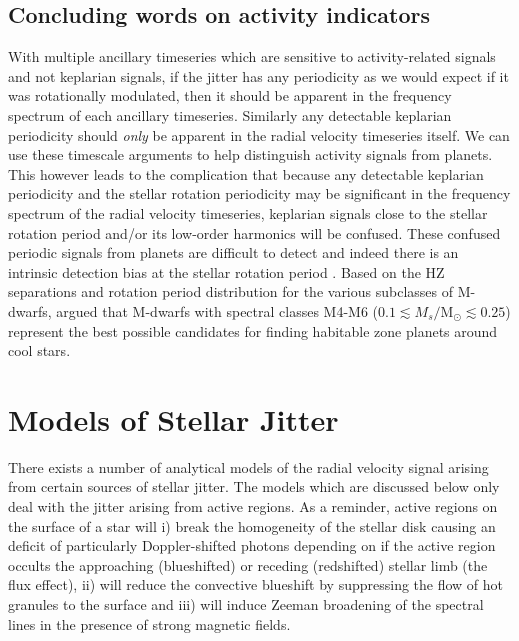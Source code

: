 \subsection{Concluding words on activity indicators}
With multiple ancillary timeseries which are sensitive to activity-related signals and not 
keplarian signals, if the jitter has any periodicity as we would expect if it was rotationally 
modulated, then it should be apparent in the frequency spectrum of each ancillary timeseries. 
Similarly any detectable keplarian periodicity should \emph{only} be apparent in the radial 
velocity timeseries itself. We can use these timescale arguments to help distinguish activity 
signals from planets. \\

This however leads to the complication that because any detectable keplarian periodicity and 
the stellar rotation periodicity may be significant in the frequency spectrum of the radial 
velocity timeseries, keplarian signals close to the stellar rotation period and/or its low-order 
harmonics will be confused. These confused periodic signals from planets are difficult to 
detect and indeed there is an intrinsic detection bias at the stellar rotation period 
\parencite{vanderburg16}. Based 
on the HZ separations and rotation period distribution for the various subclasses of M-dwarfs, 
\cite{newton16b} argued that M-dwarfs with spectral classes M4-M6 
($0.1 \lesssim M_s/$M$_{\odot} \lesssim 0.25$) 
represent the best possible candidates for finding habitable zone planets around cool stars.
 


\section{Models of Stellar Jitter} \label{sect:jittermodels}
There exists a number of analytical models of 
the radial velocity signal arising from certain sources of stellar jitter. The models which 
are discussed below only deal with the jitter arising from active regions. As a reminder, 
active regions on the surface of a star will i) break the homogeneity of the stellar disk causing 
an deficit of particularly Doppler-shifted photons depending on if the active region occults the 
approaching (blueshifted) or receding (redshifted) 
stellar limb (the flux effect), ii) will reduce the convective blueshift 
by suppressing the flow of hot granules to the surface and iii) will induce Zeeman broadening of 
the spectral lines in the presence of strong magnetic fields.

